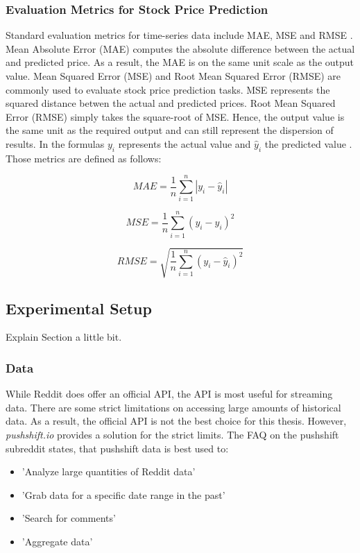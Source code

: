 \documentclass[11pt, a4paper]{article}
\begin{document}
\subsubsection{Evaluation Metrics for Stock Price Prediction}
Standard evaluation metrics for time-series data include MAE, MSE and RMSE \citep{rezaei2021stockpriceprediction}.
Mean Absolute Error (MAE) computes the absolute difference between the actual and predicted price. As a result, the MAE is on the same unit scale as
the output value.
Mean Squared Error (MSE) and Root Mean Squared Error (RMSE) are commonly used to evaluate stock price prediction tasks. MSE represents the squared distance
betwen the actual and predicted prices.
Root Mean Squared Error (RMSE) simply takes the square-root of MSE. Hence, the output value is the same unit as the required output and can still represent the
dispersion of results.
In the formulas $y_{i}$ represents the actual value and $\hat{y}_i$ the predicted value \citep{chen2021meanvariance}.
Those metrics are defined as follows:

\begin{equation*}
    MAE = \frac{1}{n}\sum_{i=1}^{n}|y_{i}-\hat{y}_{i}|
\end{equation*}

\begin{equation*}
    MSE = \frac{1}{n}\sum_{i=1}^{n}(y_{i}-\hat{y}_{i})^2
\end{equation*}

\begin{equation*}
    RMSE = \sqrt{\frac{1}{n}\sum_{i=1}^{n}(y_{i}-\hat{y}_{i})^2}
\end{equation*}


\subsection{Experimental Setup}
Explain Section a little bit.

\subsubsection{Data}

While Reddit does offer an official API, the API is most useful for streaming data. 
There are some strict limitations on accessing large amounts of historical data. As a result, the official API is not the best choice for this thesis. 
However, \emph{pushshift.io} provides a solution for the strict limits.
The FAQ on the pushshift subreddit states, that pushshift data is best used to:
\begin{itemize}
    \item 'Analyze large quantities of Reddit data'
    \item 'Grab data for a specific date range in the past'
    \item 'Search for comments'
    \item 'Aggregate data'
\end{itemize}
\end{document}
